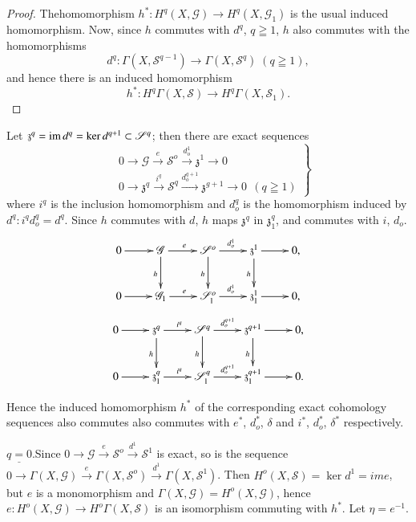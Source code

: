   \begin{proof}
The\pageoriginale homomorphism $h^* : H^q(X, \mathscr{G}) \to H^q (X,
\mathscr{G}_1)$ is the usual induced homomorphism. Now, since $h$
commutes with $d^q$, $q \geqq 1$, $h$ also commutes with the
homomorphisms 
$$
d^q : \Gamma(X,\mathscr{S}^{q-1}) \to \Gamma (X, \mathscr{S}^q) \;
 (q \geqq 1), 
$$
and hence there is an induced homomorphism 
$$
h^*:H^q \Gamma (X,\mathscr{S}) \to H^q \Gamma(X, \mathscr{S}_1). 
$$
  \end{proof}  
  
  Let $\mathfrak{z}^q=\operatorname{im}  d^q= \ker d^{q+1} \subset \mathscr{S}^q$; then
  there are exact sequences  
  \begin{equation*}
\left.
\begin{aligned}
&0 \to  \mathscr{G} \xrightarrow{e} \mathscr{S}^o \xrightarrow{d^1_o}
  \mathfrak{z}^1 \to  0 \\ 
&0 \to \mathfrak{z}^q\xrightarrow{i^q} \mathscr{S}^q
  \xrightarrow{d^{q+1}_o} \mathfrak{z}^{g+1} \to 0 ~~ (q \geqq 1)  
\end{aligned}
\right \} \tag{1}
  \end{equation*}  
  where $i^q$ is the inclusion homomorphism and $d^q_o$  is the
  homomorphism induced  by $d^q :  i^q d^q_o =d^q$. Since $h$ commutes
  with $d$, $h$  maps $\mathfrak{z}^q$ in $\mathfrak{z}^q_1$, and
  commutes with $i$, $d_o$. 
\[
\xymatrix{
0\ar[r] & \mathscr{G} \ar[r]^e\ar[d]_h & \mathscr{S}^o \ar[r]^{d^1_o}
\ar[d]_h & \mathfrak{z}^1 \ar[r]\ar[d]_h & 0,\\
0 \ar[r] & \mathscr{G}_1 \ar[r]^e & \mathscr{S}^o_1 \ar[r]^{d^1_o} &
\mathfrak{z}^1_1 \ar[r] & 0,
}\]
\[
\xymatrix{
0\ar[r] & \mathfrak{z}^q \ar[r]^{i^q}\ar[d]_h & \mathscr{S}^q \ar[r]^{d^{q+1}_o}
\ar[d]_h & \mathfrak{z}^{q+1} \ar[r]\ar[d]_h & 0,\\
0 \ar[r] & \mathfrak{z}^q_1 \ar[r]^{i^q} & \mathscr{S}^q_1 \ar[r]^{d^{q+1}_o} &
\mathfrak{z}^{q+1}_1 \ar[r] & 0 .
}
\]  

  Hence the induced homomorphism $h^*$ of the corresponding exact
  cohomology sequences also commutes also commutes with $e^*$, $d^*_o$,
  $\delta$ and $i^*$, $d^*_o$, $\delta^*$ respectively. 

\medskip
{}
$\underline{q=0}$.\pageoriginale Since $0 \to  \mathscr{G} \xrightarrow{e}
\mathscr{S}^o \xrightarrow{d^1} \mathscr{S}^1$  is exact, so is the
sequence $0 \to \Gamma(X, \mathscr{G})  \xrightarrow{e} \Gamma(X,
\mathscr{S}^o) \xrightarrow{d^1} \Gamma(X, \mathscr{S}^1)$. Then
$H^o(X, \mathscr{S})= \ker d^1= im e$, but $e$ is a monomorphism and
$\Gamma(X, \mathscr{G}) = H^o(X,\mathscr{G})$, hence $e : H^o (X,
\mathscr{G})  \to H^o \Gamma(X, \mathscr{S})$ 
is an isomorphism commuting with $h^*$. Let $\eta= e^{-1}$. 

